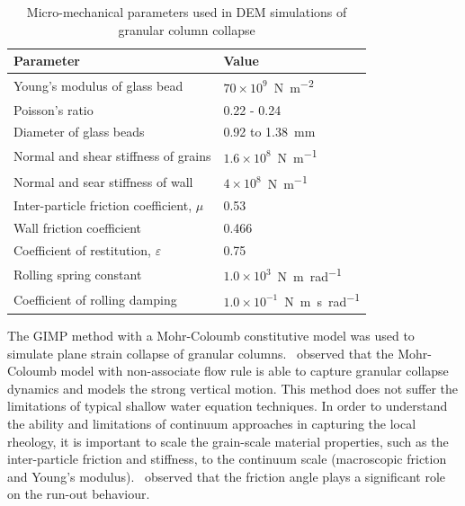\begin{table}
\caption{Micro-mechanical parameters used in DEM simulations of granular column 
collapse}
\label{table:DEM_data}
\centering
\begin{tabular}{ll}
\toprule
\textbf{Parameter} & \textbf{Value} \\ \midrule
Young's modulus of glass bead & 
$70\times10^{9}$~\si{\newton\per\m\squared}\\ 
Poisson's ratio & 0.22 - 0.24\\ 
Diameter of glass beads & 0.92 to 1.38~\si{\mm}\\
Normal and shear stiffness of grains & $1.6 \times 
10^{8}$~\si{\newton\per\m}\\ 
Normal and sear stiffness of wall & $4 \times 
10^{8}$~\si{\newton\per\m}\\
Inter-particle friction coefficient, $\mu$ & 0.53 \\
Wall friction coefficient & 0.466 \\ 
Coefficient of restitution, $\varepsilon$ & 0.75 \\ 
Rolling spring constant  & $1.0\times10^3$~\si{\newton\meter\per\radian}\\ 
Coefficient of rolling damping & $1.0 \times 
10^{-1}$~\si{\newton\meter\second\per\radian} \\ \bottomrule
\end{tabular}
\end{table}
The GIMP method with a Mohr-Coloumb constitutive model was used to simulate 
plane strain collapse of granular columns.~\citet{Crosta2009a} observed that 
the Mohr-Coloumb model with non-associate flow rule is able to capture granular 
collapse dynamics and models the strong vertical motion. This method does not 
suffer the limitations of typical shallow water equation techniques. In order 
to understand the ability and limitations of continuum approaches in capturing 
the local rheology, it is important to scale the grain-scale material 
properties, such as the inter-particle friction and stiffness, to the continuum 
scale (macroscopic friction and Young's modulus).~\citet{Crosta2009a} observed 
that the friction angle plays a significant role on the run-out behaviour. 

